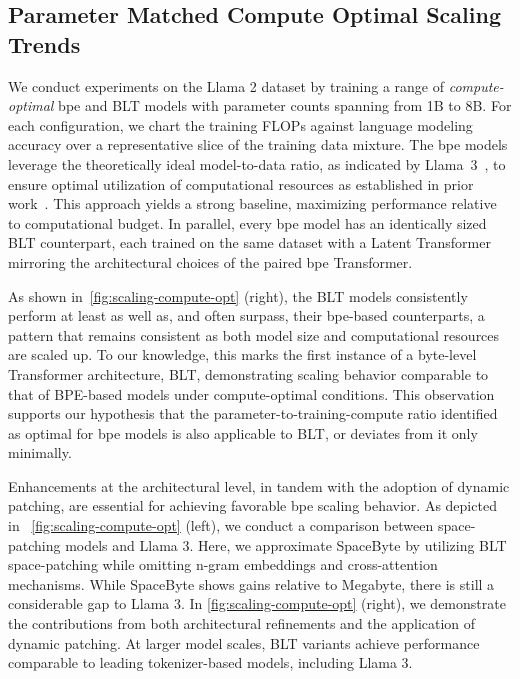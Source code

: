 \subsection{Parameter Matched Compute Optimal Scaling Trends}
\label{section:parameter-matched-scaling}
We conduct experiments on the Llama 2 dataset by training a range of \textit{compute-optimal} bpe and {\textsc BLT} models with parameter counts spanning from 1B to 8B. For each configuration, we chart the training FLOPs against language modeling accuracy over a representative slice of the training data mixture. The bpe models leverage the theoretically ideal model-to-data ratio, as indicated by Llama~3~\citep{dubey2024llama}, to ensure optimal utilization of computational resources as established in prior work~\citep{hoffmann2022training}. This approach yields a strong baseline, maximizing performance relative to computational budget. In parallel, every bpe model has an identically sized {\textsc BLT} counterpart, each trained on the same dataset with a Latent Transformer mirroring the architectural choices of the paired bpe Transformer.

As shown in~\autoref{fig:scaling-compute-opt} (right), the {\textsc BLT} models consistently perform at least as well as, and often surpass, their bpe-based counterparts, a pattern that remains consistent as both model size and computational resources are scaled up. To our knowledge, this marks the first instance of a byte-level Transformer architecture, {\textsc BLT}, demonstrating scaling behavior comparable to that of BPE-based models under compute-optimal conditions. This observation supports our hypothesis that the parameter-to-training-compute ratio identified as optimal for bpe models is also applicable to {\textsc BLT}, or deviates from it only minimally.

Enhancements at the architectural level, in tandem with the adoption of dynamic patching, are essential for achieving favorable bpe scaling behavior. As depicted in ~\autoref{fig:scaling-compute-opt} (left), we conduct a comparison between space-patching models and Llama 3. Here, we approximate SpaceByte \citep{slagle2024spacebyte} by utilizing {\textsc BLT} space-patching while omitting n-gram embeddings and cross-attention mechanisms. While SpaceByte shows gains relative to Megabyte, there is still a considerable gap to Llama 3. In \autoref{fig:scaling-compute-opt} (right), we demonstrate the contributions from both architectural refinements and the application of dynamic patching. At larger model scales, {\textsc BLT} variants achieve performance comparable to leading tokenizer-based models, including Llama 3.

